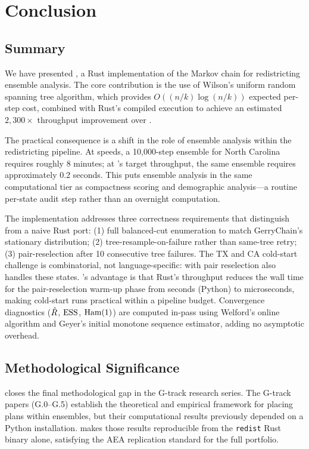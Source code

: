 \section{Conclusion}
\label{sec:conclusion}

\subsection{Summary}

We have presented \re{}, a Rust implementation of the \recom{} Markov
chain for redistricting ensemble analysis.
The core contribution is the use of Wilson's uniform random spanning tree
algorithm, which provides $O((n/k)\log(n/k))$ expected per-step cost,
combined with Rust's compiled execution to achieve an estimated
$2{,}300\times$ throughput improvement over \gc{}.

The practical consequence is a shift in the role of ensemble analysis
within the redistricting pipeline.
At \gc{} speeds, a 10{,}000-step ensemble for North Carolina requires
roughly 8 minutes; at \re{}'s target throughput, the same ensemble
requires approximately 0.2 seconds.
This puts ensemble analysis in the same computational tier as compactness
scoring and demographic analysis---a routine per-state audit step rather
than an overnight computation.

The implementation addresses three correctness requirements that
distinguish \re{} from a naive Rust port:
(1) full balanced-cut enumeration to match GerryChain's stationary
distribution;
(2) tree-resample-on-failure rather than same-tree retry;
(3) pair-reselection after 10 consecutive tree failures.
The TX and CA cold-start challenge is combinatorial, not language-specific:
\gc{} with pair reselection also handles these states.
\re{}'s advantage is that Rust's throughput reduces the wall time for
the pair-reselection warm-up phase from seconds (Python) to microseconds,
making cold-start runs practical within a pipeline budget.
Convergence diagnostics ($\hat{R}$, $\mathrm{ESS}$, $\mathrm{Ham}(1)$) are computed
in-pass using Welford's online algorithm and Geyer's initial monotone
sequence estimator, adding no asymptotic overhead.

\subsection{Methodological Significance}

\re{} closes the final methodological gap in the G-track research series.
The G-track papers (G.0--G.5) establish the theoretical and empirical
framework for placing \ar{} plans within \recom{} ensembles, but their
computational results previously depended on a Python \gc{} installation.
\re{} makes those results reproducible from the \texttt{redist} Rust
binary alone, satisfying the AEA replication standard for the full
portfolio.

